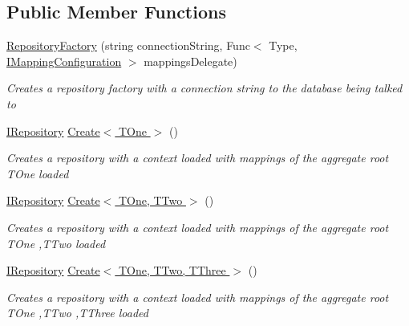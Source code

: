 \subsection*{Public Member Functions}
\begin{DoxyCompactItemize}
\item 
\hyperlink{class_highway_1_1_data_1_1_entity_framework_1_1_factory_1_1_repository_factory_a11fcf7b715d125e390df596a4fcaf9a6}{Repository\-Factory} (string connection\-String, Func$<$ Type, \hyperlink{interface_highway_1_1_data_1_1_entity_framework_1_1_mappings_1_1_i_mapping_configuration}{I\-Mapping\-Configuration} $>$ mappings\-Delegate)
\begin{DoxyCompactList}\small\item\em Creates a repository factory with a connection string to the database being talked to \end{DoxyCompactList}\item 
\hyperlink{interface_highway_1_1_data_1_1_interfaces_1_1_i_repository}{I\-Repository} \hyperlink{class_highway_1_1_data_1_1_entity_framework_1_1_factory_1_1_repository_factory_adc2a8362d9f6eba603dc296f80a464d2}{Create$<$ T\-One $>$} ()
\begin{DoxyCompactList}\small\item\em Creates a repository with a context loaded with mappings of the aggregate root {\itshape T\-One}  loaded \end{DoxyCompactList}\item 
\hyperlink{interface_highway_1_1_data_1_1_interfaces_1_1_i_repository}{I\-Repository} \hyperlink{class_highway_1_1_data_1_1_entity_framework_1_1_factory_1_1_repository_factory_a77fab4a79881f8cdee299599b72b15ce}{Create$<$ T\-One, T\-Two $>$} ()
\begin{DoxyCompactList}\small\item\em Creates a repository with a context loaded with mappings of the aggregate root {\itshape T\-One} ,{\itshape T\-Two}  loaded \end{DoxyCompactList}\item 
\hyperlink{interface_highway_1_1_data_1_1_interfaces_1_1_i_repository}{I\-Repository} \hyperlink{class_highway_1_1_data_1_1_entity_framework_1_1_factory_1_1_repository_factory_a1de27f1264d65c2927bdc6dc02329a27}{Create$<$ T\-One, T\-Two, T\-Three $>$} ()
\begin{DoxyCompactList}\small\item\em Creates a repository with a context loaded with mappings of the aggregate root {\itshape T\-One} ,{\itshape T\-Two} ,{\itshape T\-Three}  loaded \end{DoxyCompactList}\item 

\end{DoxyCompactItemize}

